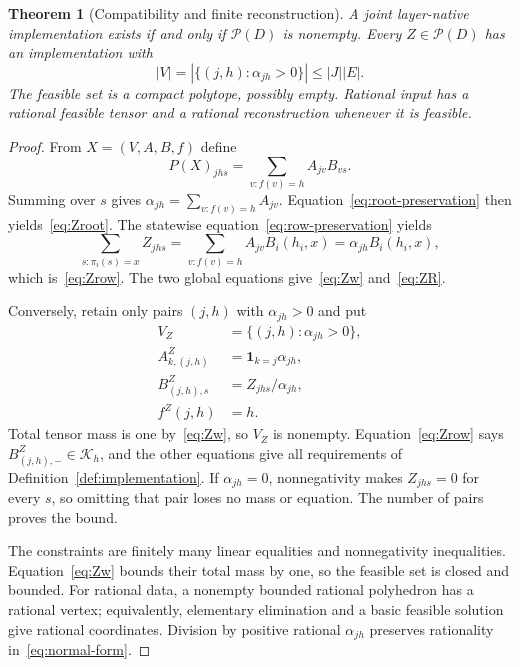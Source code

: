 \documentclass[11pt]{article}
\newcommand{\Pcal}{\mathcal P}
\newcommand{\Kcal}{\mathcal K}
\newtheorem{theorem}{Theorem}[section]
\theoremstyle{remark}
\begin{document}
\begin{theorem}[Compatibility and finite reconstruction]\label{thm:compatibility}
A joint layer-native implementation exists if and only if $\Pcal(D)$ is nonempty. Every $Z\in\Pcal(D)$ has an implementation with
\[
 |V|=|\{(j,h):\alpha_{jh}>0\}|\le |J||E|.
\]
The feasible set is a compact polytope, possibly empty. Rational input has a rational feasible tensor and a rational reconstruction whenever it is feasible.
\end{theorem}
\begin{proof}
From $X=(V,A,B,f)$ define
\begin{equation}\label{eq:PX}
 P(X)_{jhs}=\sum_{v:f(v)=h}A_{jv}B_{vs}.
\end{equation}
Summing over $s$ gives $\alpha_{jh}=\sum_{v:f(v)=h}A_{jv}$. Equation~\eqref{eq:root-preservation} then yields~\eqref{eq:Zroot}. The statewise equation~\eqref{eq:row-preservation} yields
\[
 \sum_{s:\pi_i(s)=x}Z_{jhs}
 =\sum_{v:f(v)=h}A_{jv}B_i(h_i,x)
 =\alpha_{jh}B_i(h_i,x),
\]
which is~\eqref{eq:Zrow}. The two global equations give~\eqref{eq:Zw} and~\eqref{eq:ZR}.

Conversely, retain only pairs $(j,h)$ with $\alpha_{jh}>0$ and put
\begin{equation}\label{eq:normal-form}
 \begin{split}
 V_Z&=\{(j,h):\alpha_{jh}>0\},\\
 A^Z_{k,(j,h)}&=\mathbf1_{k=j}\alpha_{jh},\\
 B^Z_{(j,h),s}&=Z_{jhs}/\alpha_{jh},\\
 f^Z(j,h)&=h.
 \end{split}
\end{equation}
Total tensor mass is one by~\eqref{eq:Zw}, so $V_Z$ is nonempty. Equation~\eqref{eq:Zrow} says $B^Z_{(j,h),-}\in\Kcal_h$, and the other equations give all requirements of Definition~\ref{def:implementation}. If $\alpha_{jh}=0$, nonnegativity makes $Z_{jhs}=0$ for every $s$, so omitting that pair loses no mass or equation. The number of pairs proves the bound.

The constraints are finitely many linear equalities and nonnegativity inequalities. Equation~\eqref{eq:Zw} bounds their total mass by one, so the feasible set is closed and bounded. For rational data, a nonempty bounded rational polyhedron has a rational vertex; equivalently, elementary elimination and a basic feasible solution give rational coordinates. Division by positive rational $\alpha_{jh}$ preserves rationality in~\eqref{eq:normal-form}.
\end{proof}
\end{document}
